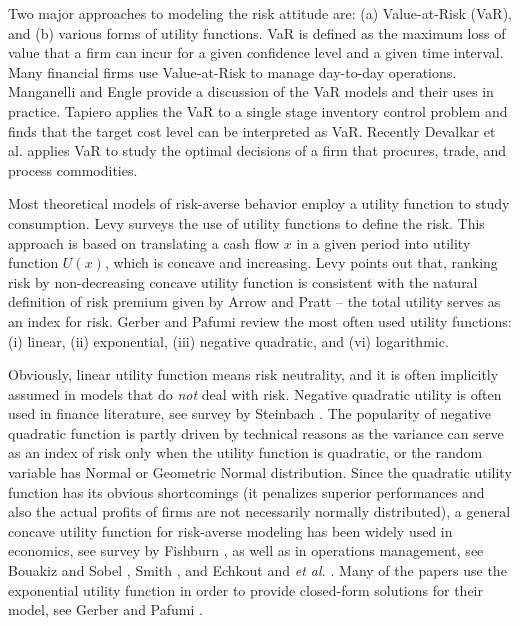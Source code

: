 \documentclass[mnsc,nonblindrev,copyedit]{informs2_wz} %
\begin{document}
Two major approaches to modeling the risk attitude are: (a) Value-at-Risk (VaR), and (b) various forms of utility functions.  VaR is defined as the maximum loss of value that a firm can incur for a given confidence level and a given time interval.  Many financial firms use Value-at-Risk to manage day-to-day operations.  Manganelli and Engle \cite{Manganelli2001} provide a discussion of the VaR models and their uses in practice. Tapiero \cite{tapiero_value_2005} applies the VaR to a single stage inventory control problem and finds that the target cost level can be interpreted as VaR.  Recently Devalkar et al. \cite{devalkar_integrated_2010} applies VaR to study the optimal decisions of a firm that procures, trade, and process commodities.

\medskip

Most theoretical models of risk-averse behavior employ a utility function to study consumption.  Levy \cite{Levy92} surveys the use of utility functions to define the risk.  This approach is based on translating a cash flow $x$ in a given period into utility function $U(x)$, which is concave and increasing.  Levy points out that, ranking risk by non-decreasing concave utility function is consistent with the natural definition of risk premium given by Arrow \cite{Arrow1951} and Pratt \cite{Pratt1964} -- the total utility serves as an index for risk.  Gerber and Pafumi \cite{Gerber1998} review the most often used utility functions: (i) linear, (ii) exponential, (iii) negative quadratic, and (vi) logarithmic.

Obviously, linear utility function means risk neutrality, and it is often implicitly assumed in models that do \emph{not} deal with risk.  Negative quadratic utility is often used in finance literature, see survey by Steinbach \cite{Steinbach2001}.  The popularity of negative quadratic function is partly driven by technical reasons as the variance can serve as an index of risk only when the utility function is quadratic, or the random variable has Normal or Geometric Normal distribution.  Since the quadratic utility function has its obvious shortcomings (it penalizes superior performances and also the actual profits of firms are not necessarily normally distributed), a general concave utility function for risk-averse modeling has been widely used in economics, see survey by Fishburn \cite{Fishburn1989}, as well as in operations management, see Bouakiz and Sobel \cite{Bouakiz1992}, Smith \cite{Smith1998}, and Echkout and {\it et al.} \cite{Eeckhoudt1995}.  Many of the papers use the exponential utility function in order to provide closed-form solutions for their model, see Gerber and Pafumi \cite{Gerber1998}.
\end{document}
